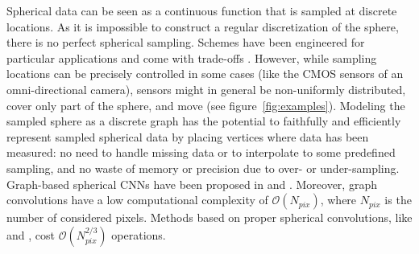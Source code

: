 \documentclass{article} %
\newcommand{\figref}[1]{figure~\ref{fig:#1}}
\newcommand{\1}{\b{1}}              %
\newcommand{\0}{\b{0}}              %
\newcommand{\R}{\mathbb{R}}
\newcommand{\bO}{\mathcal{O}}
\newcommand{\todo}[1]{{\color[rgb]{.6,.1,.6}{#1}}}
\begin{document}
Spherical data can be seen as a continuous function
that is sampled at discrete locations.
As it is impossible to construct a regular discretization of the sphere, there is no perfect spherical sampling.
Schemes have been engineered for particular applications and come with trade-offs \citep{gorski2005healpix,glesp}.
However, while sampling locations can be precisely controlled in some cases (like the CMOS sensors of an omni-directional camera), sensors might in general be non-uniformly distributed, cover only part of the sphere, and move (see \figref{examples}).
Modeling the sampled sphere as a discrete graph has the potential to faithfully and efficiently represent sampled spherical data by placing vertices where data has been measured: no need to handle missing data or to interpolate to some predefined sampling, and no waste of memory or precision due to over- or under-sampling.
Graph-based spherical CNNs have been proposed in \citet{khasanova2017graphomni} and \citet{perraudin2018deepsphere}.
Moreover, graph convolutions have a low computational complexity of $\bO(N_{pix})$, where $N_{pix}$ is the number of considered pixels.
Methods based on proper spherical convolutions, like \citet{cohen2018sphericalcnn} and \citet{esteves2017sphericalcnn}, cost $\bO(N_{pix}^{2/3})$ operations.



\end{document}
